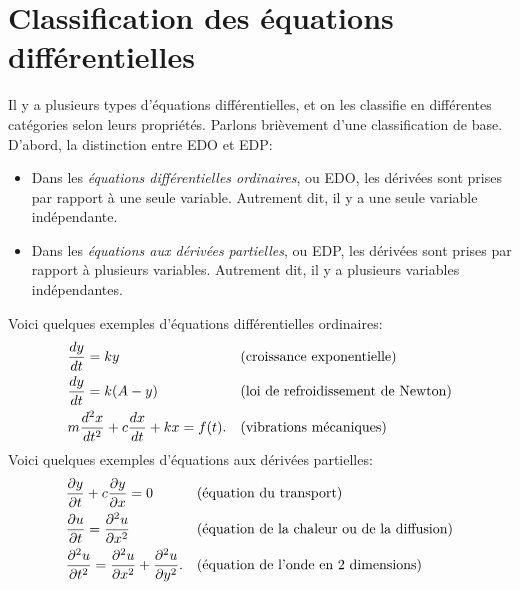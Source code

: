 \sectionnewpage
\section{Classification des équations différentielles}
\label{classification:section}

Il y a plusieurs types d'équations différentielles, et on les classifie en différentes catégories selon leurs propriétés.  Parlons brièvement d'une classification de base.  D'abord, la distinction entre EDO et EDP:
\begin{itemize}
\item
	Dans les \emph{équations différentielles ordinaires}, ou EDO, les dérivées sont prises par rapport à une seule variable.  Autrement dit, il y a une seule variable indépendante.

\item
	Dans les \emph{équations aux dérivées partielles}, ou EDP, les dérivées sont prises par rapport à plusieurs variables.  Autrement dit, il y a plusieurs variables indépendantes.
\end{itemize}

Voici quelques exemples d'équations différentielles ordinaires:
\begin{align*}
	& \frac{d y}{dt} = ky  & & \text{(croissance exponentielle\index{exponential growth})} \\
	& \frac{d y}{dt} = k(A-y)  & & \text{(\myindex{loi de refroidissement de Newton})} \\
	& m \frac{d^2 x}{dt^2} + c \frac{dx}{dt} + kx = f(t) . & &
\text{(vibrations mécaniques\index{mechanical vibrations})}
\end{align*}
Voici quelques exemples d'équations aux dérivées partielles:
\begin{align*}
	& \frac{\partial y}{\partial t} + c \frac{\partial y}{\partial x} = 0 & & 
		\text{(équation du transport\index{Équation du transport})} \\
	& \frac{\partial u}{\partial t} = \frac{\partial^2 u}{\partial x^2}  & & 
		\text{(équation de la chaleur ou de la diffusion\index{Équation de la chaleur/diffusion})} \\
	& \frac{\partial^2 u}{\partial t^2} = \frac{\partial^2 u}{\partial x^2} + \frac{\partial^2 u}{\partial y^2} . & & 
		\text{(équation de l'onde en 2 dimensions\index{Équation de l'onde en deux dimensions})}
\end{align*}


